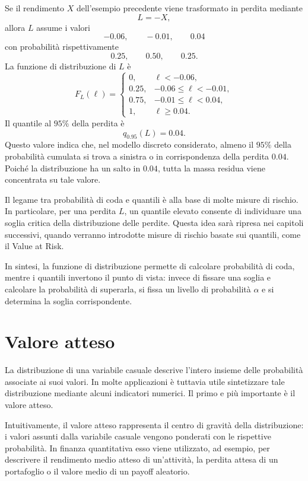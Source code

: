 \begin{example}
Se il rendimento $X$ dell'esempio precedente viene trasformato in perdita
mediante
\[
L=-X,
\]
allora $L$ assume i valori
\[
-0.06,\qquad -0.01,\qquad 0.04
\]
con probabilit\`{a} rispettivamente
\[
0.25,\qquad 0.50,\qquad 0.25.
\]
La funzione di distribuzione di $L$ \`{e}
\[
F_L(\ell)=
\begin{cases}
0, & \ell<-0.06,\\
0.25, & -0.06\leq \ell<-0.01,\\
0.75, & -0.01\leq \ell<0.04,\\
1, & \ell\geq 0.04.
\end{cases}
\]
Il quantile al $95\%$ della perdita \`{e}
\[
q_{0.95}(L)=0.04.
\]
Questo valore indica che, nel modello discreto considerato, almeno il $95\%$
della probabilit\`{a} cumulata si trova a sinistra o in corrispondenza della
perdita $0.04$. Poich\'{e} la distribuzione ha un salto in $0.04$, tutta la massa
residua viene concentrata su tale valore.
\end{example}

Il legame tra probabilit\`{a} di coda e quantili \`{e} alla base di molte misure
di rischio. In particolare, per una perdita $L$, un quantile elevato consente di
individuare una soglia critica della distribuzione delle perdite. Questa idea sar\`{a}
ripresa nei capitoli successivi, quando verranno introdotte misure di rischio
basate sui quantili, come il Value at Risk.

In sintesi, la funzione di distribuzione permette di calcolare probabilit\`{a} di
coda, mentre i quantili invertono il punto di vista: invece di fissare una soglia
e calcolare la probabilit\`{a} di superarla, si fissa un livello di probabilit\`{a}
$\alpha$ e si determina la soglia corrispondente.


\section{Valore atteso}
\label{sec:cap2-valore-atteso}

La distribuzione di una variabile casuale descrive l'intero insieme delle
probabilit\`{a} associate ai suoi valori. In molte applicazioni \`{e} tuttavia
utile sintetizzare tale distribuzione mediante alcuni indicatori numerici. Il
primo e pi\`{u} importante \`{e} il valore atteso.

Intuitivamente, il valore atteso rappresenta il centro di gravit\`{a} della
distribuzione: i valori assunti dalla variabile casuale vengono ponderati con le
rispettive probabilit\`{a}. In finanza quantitativa esso viene utilizzato, ad
esempio, per descrivere il rendimento medio atteso di un'attivit\`{a}, la perdita
attesa di un portafoglio o il valore medio di un payoff aleatorio.

